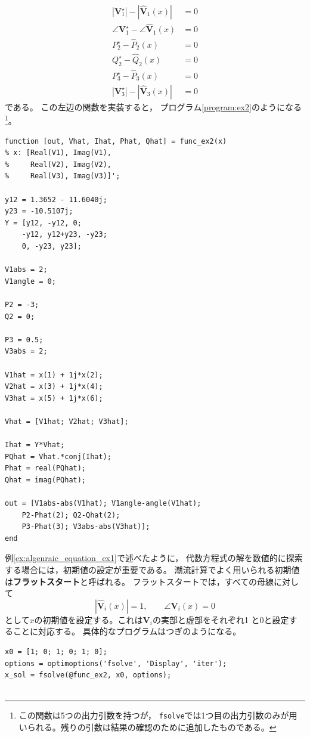 \documentclass[tombow,dvipdfmx]{corona-a5-1.1}
\begin{document}
\begin{例}[潮流計算の実装法]
\begin{align*}
    |\bm V_1^{\star}|-|\hat{\bm V}_1(x)| &= 0\\
    \angle \bm V_1^{\star} - \angle \hat{\bm V}_1(x) &= 0\\
    P_2^{\star} -\hat P_2(x) &= 0\\
    Q_2^{\star} -\hat Q_2(x) &= 0\\
    P_3^{\star} -\hat P_3(x) &= 0\\
    |\bm V_3^{\star}|-|\hat{\bm V}_3(x)| &= 0
 \end{align*}
 である。
 この左辺の関数を実装すると，
 プログラム\nobreak\ref{program:ex2}のようになる \footnote{この関数は5つの出力引数を持つが，
 \texttt{fsolve}では1つ目の出力引数のみが用いられる。残りの引数は結果の確認のために追加したものである。}。


\smallskip
\begin{PROGRAMA}[count, title={func\_ex2.m}]\label{program:ex2}
\begin{verbatim}
function [out, Vhat, Ihat, Phat, Qhat] = func_ex2(x)
% x: [Real(V1), Imag(V1),
%     Real(V2), Imag(V2),
%     Real(V3), Imag(V3)]';

y12 = 1.3652 - 11.6040j;
y23 = -10.5107j;
Y = [y12, -y12, 0;
    -y12, y12+y23, -y23;
    0, -y23, y23];

V1abs = 2;
V1angle = 0;

P2 = -3;
Q2 = 0;

P3 = 0.5;
V3abs = 2;

V1hat = x(1) + 1j*x(2);
V2hat = x(3) + 1j*x(4);
V3hat = x(5) + 1j*x(6);

Vhat = [V1hat; V2hat; V3hat];

Ihat = Y*Vhat;
PQhat = Vhat.*conj(Ihat);
Phat = real(PQhat);
Qhat = imag(PQhat);

out = [V1abs-abs(V1hat); V1angle-angle(V1hat);
    P2-Phat(2); Q2-Qhat(2);
    P3-Phat(3); V3abs-abs(V3hat)];
end
\end{verbatim}
\end{PROGRAMA}

例\nobreak\ref{ex:algenraic_equation_ex1}で述べたように，
代数方程式の解を数値的に探索する場合には，初期値の設定が重要である。
潮流計算でよく用いられる初期値は\textbf{フラットスタート}と呼ばれる。
フラットスタートでは，すべての母線に対して
\[
|\hat{\bm V}_i(x)|=1
,\qquad
\angle \bm V_i(x) = 0
\]
として$x$の初期値を設定する。これは$\bm V_i$の実部と虚部をそれぞれ1
と0と設定することに対応する。
具体的なプログラムはつぎのようになる。

\smallskip
\begin{PROGRAMA}[count,title={main\_ex2.m}]\label{program:ex2_main}
\begin{verbatim}
x0 = [1; 0; 1; 0; 1; 0];
options = optimoptions('fsolve', 'Display', 'iter');
x_sol = fsolve(@func_ex2, x0, options);


\end{verbatim}
\end{PROGRAMA}
\end{例}
\end{document}
